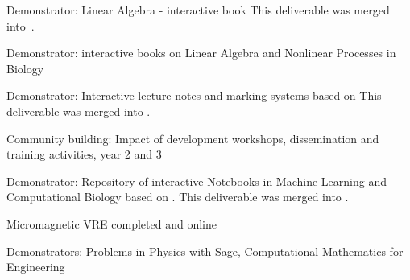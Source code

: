 \begin{workpackage}
\begin{wpdelivs}
\begin{wpdeliv}[due=24,miles=UI-vre-prototype,id=ibook2,dissem=PU,nature=DEM,lead=US,issue=48,status=canceled]
    {Demonstrator: Linear Algebra - interactive book}
    This deliverable was merged into~.
  \end{wpdeliv}
  \begin{wpdeliv}[due=36,id=ibook1,miles=UI-vre-prototype,dissem=PU,nature=DEM,lead=US,issue=49]
    {Demonstrator: interactive books on Linear Algebra and Nonlinear Processes in Biology}
  \end{wpdeliv}
  \begin{wpdeliv}[due=36,id=lecture-notes,miles=UI-vre,dissem=PU,nature=DEM,lead=USH,issue=35,status=canceled]
    {Demonstrator: Interactive lecture notes and marking systems based on \TheProject}
    This deliverable was merged into .
  \end{wpdeliv}
  \begin{wpdeliv}[due=36,id=workshops-3,dissem=PU,miles=eval,nature=R,lead=PS,issue=36]
    {Community building: Impact of development workshops, dissemination and training activities, year 2 and 3}
  \end{wpdeliv}
  \begin{wpdeliv}[due=44,miles=eval,id=notebook-repo,dissem=PU,nature=DEM,lead=USH,issue=37,status=canceled]
    {Demonstrator: Repository of interactive Notebooks in Machine Learning and Computational Biology based on \TheProject.}
    This deliverable was merged into .
  \end{wpdeliv}
  \begin{wpdeliv}[due=48,miles=UI-vre,id=oommfnb-vre-deliver,dissem=PU,nature=OTHER,lead=XFEL,issue=38]{Micromagnetic VRE completed and online} \end{wpdeliv}
  \begin{wpdeliv}[due=47,miles=eval,id=ibook3c,dissem=PU,nature=DEM,lead=US,issue=39]{Demonstrators: Problems in Physics with Sage, Computational Mathematics for Engineering}
  \end{wpdeliv}


\end{wpdelivs}
\end{workpackage}
